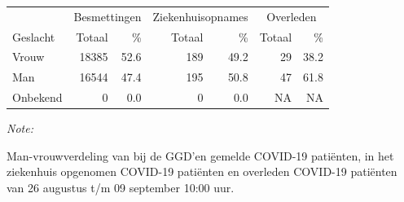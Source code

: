 \documentclass[
  english,
  man,floatsintext]{apa6}
\begin{document}
\begin{table}
\centering\begingroup\fontsize{11}{13}\selectfont

\begin{threeparttable}
\begin{tabular}{lrrrrrr}
\toprule
\multicolumn{1}{c}{ } & \multicolumn{2}{c}{Besmettingen} & \multicolumn{2}{c}{Ziekenhuisopnames} & \multicolumn{2}{c}{Overleden} \\
\cmidrule(l{3pt}r{3pt}){2-3} \cmidrule(l{3pt}r{3pt}){4-5} \cmidrule(l{3pt}r{3pt}){6-7}
Geslacht & Totaal & \% & Totaal & \% & Totaal & \%\\
\midrule
Vrouw & 18385 & 52.6 & 189 & 49.2 & 29 & 38.2\\
Man & 16544 & 47.4 & 195 & 50.8 & 47 & 61.8\\
Onbekend & 0 & 0.0 & 0 & 0.0 & NA & NA\\
\bottomrule
\end{tabular}
\begin{tablenotes}
\item \textit{Note: } 
\item Man-vrouwverdeling van bij de GGD’en gemelde COVID-19 patiënten, in het ziekenhuis opgenomen COVID-19 patiënten en overleden COVID-19 patiënten van 26 augustus t/m 09 september 10:00 uur.
\end{tablenotes}
\end{threeparttable}
\endgroup{}
\end{table}
\newpage
\end{document}
